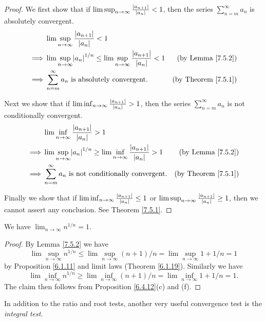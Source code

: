 \begin{proof}
We first show that if \(\lim\sup_{n \to \infty} \frac{\abs*{a_{n + 1}}}{\abs*{a_n}} < 1\), then the series \(\sum_{n = m}^\infty a_n\) is absolutely convergent.
\begin{align*}
& \lim\sup_{n \to \infty} \frac{\abs*{a_{n + 1}}}{\abs*{a_n}} < 1 \\
\implies & \lim\sup_{n \to \infty} \abs*{a_n}^{1 / n} \leq \lim\sup_{n \to \infty} \frac{\abs*{a_{n + 1}}}{\abs*{a_n}} < 1 & \text{(by Lemma \ref{7.5.2})} \\
\implies & \sum_{n = m}^\infty a_n \text{ is absolutely convergent}. & \text{(by Theorem \ref{7.5.1})}
\end{align*}

Next we show that if \(\lim\inf_{n \to \infty} \frac{\abs*{a_{n + 1}}}{\abs*{a_n}} > 1\), then the series \(\sum_{n = m}^\infty a_n\) is not conditionally convergent.
\begin{align*}
& \lim\inf_{n \to \infty} \frac{\abs*{a_{n + 1}}}{\abs*{a_n}} > 1 \\
\implies & \lim\sup_{n \to \infty} \abs*{a_n}^{1 / n} \geq \lim\inf_{n \to \infty} \frac{\abs*{a_{n + 1}}}{\abs*{a_n}} > 1 & \text{(by Lemma \ref{7.5.2})} \\
\implies & \sum_{n = m}^\infty a_n \text{ is not conditionally convergent}. & \text{(by Theorem \ref{7.5.1})}
\end{align*}

Finally we show that if \(\lim\inf_{n \to \infty} \frac{\abs*{a_{n + 1}}}{\abs*{a_n}} \leq 1\) or \(\lim\sup_{n \to \infty} \frac{\abs*{a_{n + 1}}}{\abs*{a_n}} \geq 1\), then we cannot assert any conclusion.
See Theorem \ref{7.5.1}.
\end{proof}

\begin{proposition}\label{7.5.4}
We have \(\lim_{n \to \infty} n^{1 / n} = 1\).
\end{proposition}

\begin{proof}
By Lemma \ref{7.5.2} we have
\[
    \lim\sup_{n \to \infty} n^{1 / n} \leq \lim\sup_{n \to \infty} (n + 1) / n = \lim\sup_{n \to \infty} 1 + 1 / n = 1
\]
by Proposition \ref{6.1.11} and limit laws (Theorem \ref{6.1.19}).
Similarly we have
\[
    \lim\inf_{n \to \infty} n^{1 / n} \geq \lim\inf_{n \to \infty} (n + 1) / n = \lim\inf_{n \to \infty} 1 + 1 / n = 1.
\]
The claim then follows from Proposition \ref{6.4.12}(c) and (f).
\end{proof}

\begin{remark}\label{7.5.5}
In addition to the ratio and root tests, another very useful convergence test is the \emph{integral test}.
\end{remark}